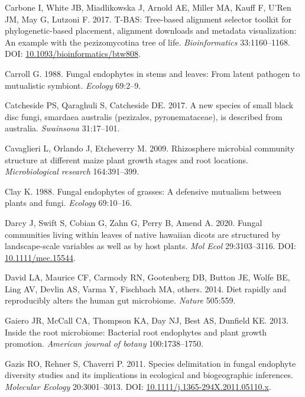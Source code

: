 \documentclass[fleqn,10pt,lineno]{wlpeerj} %
\newlength{\cslhangindent}
\newenvironment{CSLReferences}[2] %
 {%
  \setlength{\parindent}{0pt}
  \ifodd #1 \everypar{\setlength{\hangindent}{\cslhangindent}}\ignorespaces\fi
  \ifnum #2 > 0
  \setlength{\parskip}{#2\baselineskip}
  \fi
 }%
 {}
\begin{document}
\begin{CSLReferences}{1}{0}
\leavevmode{}%
Carbone I, White JB, Miadlikowska J, Arnold AE, Miller MA, Kauff F, U'Ren JM, May G, Lutzoni F. 2017. T-BAS: Tree-based alignment selector toolkit for phylogenetic-based placement, alignment downloads and metadata visualization: An example with the pezizomycotina tree of life. \emph{Bioinformatics} 33:1160--1168. DOI: \href{https://doi.org/10.1093/bioinformatics/btw808}{10.1093/bioinformatics/btw808}.

\leavevmode{}%
Carroll G. 1988. Fungal endophytes in stems and leaves: From latent pathogen to mutualistic symbiont. \emph{Ecology} 69:2--9.

\leavevmode{}%
Catcheside PS, Qaraghuli S, Catcheside DE. 2017. A new species of small black disc fungi, smardaea australis (pezizales, pyronemataceae), is described from australia. \emph{Swainsona} 31:17--101.

\leavevmode{}%
Cavaglieri L, Orlando J, Etcheverry M. 2009. Rhizosphere microbial community structure at different maize plant growth stages and root locations. \emph{Microbiological research} 164:391--399.

\leavevmode{}%
Clay K. 1988. Fungal endophytes of grasses: A defensive mutualism between plants and fungi. \emph{Ecology} 69:10--16.

\leavevmode{}%
Darcy J, Swift S, Cobian G, Zahn G, Perry B, Amend A. 2020. Fungal communities living within leaves of native hawaiian dicots are structured by landscape-scale variables as well as by host plants. \emph{Mol Ecol} 29:3103--3116. DOI: \href{https://doi.org/10.1111/mec.15544}{10.1111/mec.15544}.

\leavevmode{}%
David LA, Maurice CF, Carmody RN, Gootenberg DB, Button JE, Wolfe BE, Ling AV, Devlin AS, Varma Y, Fischbach MA, others. 2014. Diet rapidly and reproducibly alters the human gut microbiome. \emph{Nature} 505:559.

\leavevmode{}%
Gaiero JR, McCall CA, Thompson KA, Day NJ, Best AS, Dunfield KE. 2013. Inside the root microbiome: Bacterial root endophytes and plant growth promotion. \emph{American journal of botany} 100:1738--1750.

\leavevmode{}%
Gazis RO, Rehner S, Chaverri P. 2011. Species delimitation in fungal endophyte diversity studies and its implications in ecological and biogeographic inferences. \emph{Molecular Ecology} 20:3001--3013. DOI: \href{https://doi.org/10.1111/j.1365-294X.2011.05110.x}{10.1111/j.1365-294X.2011.05110.x}.


\end{CSLReferences}
\end{document}

